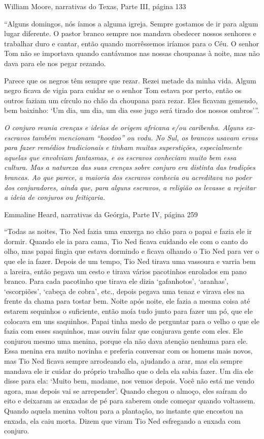 William Moore, narrativas do Texas, Parte III, página 133

``Alguns domingos, nós íamos a alguma igreja. Sempre gostamos de ir para
algum lugar diferente. O pastor branco sempre nos mandava obedecer
nossos senhores e trabalhar duro e cantar, então quando morrêssemos
iríamos para o Céu. O senhor Tom não se importava quando cantávamos nas
nossas choupanas à noite, mas não dava para ele nos pegar rezando.

Parece que os negros têm sempre que rezar. Rezei metade da minha vida.
Algum negro ficava de vigia para cuidar se o senhor Tom estava por
perto, então os outros faziam um círculo no chão da choupana para rezar.
Eles ficavam gemendo, bem baixinho: `Um dia, um dia, um dia esse jugo
será tirado dos nossos ombros'''.

\emph{O conjuro reunia crenças e ideias de origem africana e/ou
caribenha. Alguns ex-escravos também mencionam ``hoodoo'' ou vodu. No
Sul, os brancos usavam ervas para fazer remédios tradicionais e tinham
muitas superstições, especialmente aquelas que envolviam fantasmas, e os
escravos conheciam muito bem essa cultura. Mas a natureza das suas
crenças sobre conjuro era distinta das tradições brancas. Ao que parece,
a maioria dos escravos conhecia ou acreditava no poder dos conjuradores,
ainda que, para alguns escravos, a religião os levasse a rejeitar a
ideia de conjuros ou feitiçaria.}

Emmaline Heard, narrativas da Geórgia, Parte IV, página 259

``Todas as noites, Tio Ned fazia uma enxerga no chão para o papai e
fazia ele ir dormir. Quando ele ia para cama, Tio Ned ficava cuidando
ele com o canto do olho, mas papai fingia que estava dormindo e ficava
olhando o Tio Ned para ver o que ele ia fazer. Depois de um tempo, Tio
Ned tirava uma vassoura e varria bem a lareira, então pegava um cesto e
tirava vários pacotinhos enrolados em pano branco. Para cada pacotinho
que tirava ele dizia `gafanhotos', `aranhas', `escorpiões', `cabeça de
cobra', etc., depois pegava uma tenaz e virava eles na frente da chama
para tostar bem. Noite após noite, ele fazia a mesma coisa até estarem
sequinhos o suficiente, então moía tudo junto para fazer um pó, que ele
colocava em uns saquinhos. Papai tinha medo de perguntar para o velho o
que ele fazia com esses saquinhos, mas ouviu falar que conjurava gente
com eles. Ele conjurou mesmo uma menina, porque ela não dava atenção
nenhuma para ele. Essa menina era muito novinha e preferia conversar com
os homens mais novos, mas Tio Ned ficava sempre arrodeando ela, ajudando
a arar, mas ela sempre mandava ele ir cuidar do próprio trabalho que o
dela ela sabia fazer. Um dia ele disse para ela: `Muito bem, madame, nos
vemos depois. Você não está me vendo agora, mas depois vai se
arrepender'. Quando chegou o almoço, eles saíram do eito e deixaram as
enxadas de pé para saberem onde começar quando voltassem. Quando aquela
menina voltou para a plantação, no instante que encostou na enxada, ela
caiu morta. Dizem que viram Tio Ned esfregando a enxada com conjuro.

